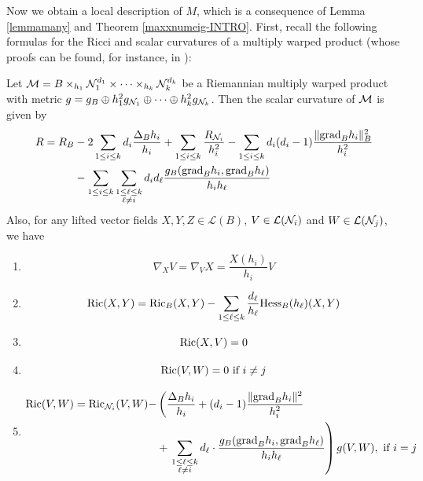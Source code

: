         Now we obtain a local description of $M$, which is a consequence of Lemma \ref{lemmamany} and Theorem \cref{maxxnumeig-INTRO}. First, recall the following formulas for the Ricci and scalar curvatures of a multiply warped product (whose proofs can be found, for instance, in ):\\

        \begin{lema}\label{warped}
        Let $\mathcal{M} = B \times_{h_1} \mathcal{N}_1^{d_1} \times \cdots \times_{h_k} \mathcal{N}_{k}^{d_k}$ be a Riemannian multiply warped product with metric $g = g_{B} \oplus h_1^2 g_{\mathcal{N}_1} \oplus \cdots \oplus h_{k}^2 g_{\mathcal{N}_k}$. Then the scalar curvature of $\mathcal{M}$ is given by
        \begin{equation}\label{ScalWarped}
        \begin{aligned}
        R = R_{B} &- 2 \sum_{1 \leq i \leq k} d_i \frac{\Delta_B h_i}{h_i} + \sum_{1 \leq i \leq k} \frac{R_{\mathcal{N}_i}}{h_i^2} - \sum_{1 \leq i \leq k} d_i(d_i - 1) \frac{\| \textnormal{grad}_B h_i \|_B^2}{h_i^2} \\
        &- \sum_{1 \leq i \leq k} \sum_{\substack{1 \leq \ell \leq k \\
        \ell \neq i  \\
        }} d_i d_{\ell} \frac{g_B(\textnormal{grad}_B h_i, \textnormal{grad}_B h_{\ell})}{h_i h_{\ell}}
        \end{aligned}
        \end{equation}
        Also, for any lifted vector fields $X, Y, Z \in \mathcal{L}(B)$, $V \in \mathcal{L}(\mathcal{N}_i)$ and $W \in \mathcal{L}(\mathcal{N}_j)$, we have
        \begin{enumerate}[label=\color{MH}\normalfont\textbf{(\theenumi)}]
        \item\label{NablaWarp} \[
        \nabla_X V = \nabla_V X = \frac{X(h_i)}{h_i} V
        \]
        \item\label{RicXY} \[
        \mathrm{Ric}(X, Y) = \mathrm{Ric}_B(X,Y) - \sum_{1 \leq \ell \leq k} \frac{d_{\ell}}{h_{\ell}} \textnormal{Hess}_B(h_{\ell})(X, Y)
        \]
        \item\label{RicXV} \[
        \mathrm{Ric}(X, V) = 0
        \]
        \item\label{RicVWd} \[
        \mathrm{Ric}(V, W) = 0 \text{ if } i \neq j
        \]
        \item\label{RicVWi} \[ \begin{aligned}
        \mathrm{Ric}(V, W) = \mathrm{Ric}_{\mathcal{N}_i}(V, W) - &\left(\frac{\Delta_B h_i}{h_i} + (d_i - 1) \frac{\| \textnormal{grad}_{B} h_i \|^2}{h_i^2} \right.\\ &+ \left.\sum_{\substack{1 \leq \ell \leq k \\
        \ell \neq i  \\
        }} d_{\ell} \cdot \frac{g_B(\textnormal{grad}_B h_i, \textnormal{grad}_B h_{\ell})}{h_i h_{\ell}} \right) g(V, W), \text{ if } i = j
        \end{aligned}
        \]
        \end{enumerate}
        \end{lema}
        
